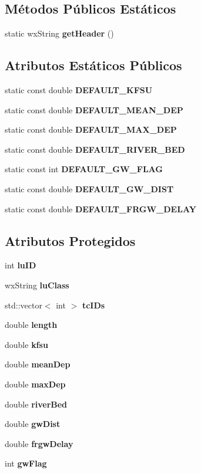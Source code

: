 \subsection*{Métodos Públicos Estáticos}
\begin{DoxyCompactItemize}
\item 
static wx\+String {\bf get\+Header} ()
\end{DoxyCompactItemize}
\subsection*{Atributos Estáticos Públicos}
\begin{DoxyCompactItemize}
\item 
static const double {\bf D\+E\+F\+A\+U\+L\+T\+\_\+\+K\+F\+SU}
\item 
static const double {\bf D\+E\+F\+A\+U\+L\+T\+\_\+\+M\+E\+A\+N\+\_\+\+D\+EP}
\item 
static const double {\bf D\+E\+F\+A\+U\+L\+T\+\_\+\+M\+A\+X\+\_\+\+D\+EP}
\item 
static const double {\bf D\+E\+F\+A\+U\+L\+T\+\_\+\+R\+I\+V\+E\+R\+\_\+\+B\+ED}
\item 
static const int {\bf D\+E\+F\+A\+U\+L\+T\+\_\+\+G\+W\+\_\+\+F\+L\+AG}
\item 
static const double {\bf D\+E\+F\+A\+U\+L\+T\+\_\+\+G\+W\+\_\+\+D\+I\+ST}
\item 
static const double {\bf D\+E\+F\+A\+U\+L\+T\+\_\+\+F\+R\+G\+W\+\_\+\+D\+E\+L\+AY}
\end{DoxyCompactItemize}
\subsection*{Atributos Protegidos}
\begin{DoxyCompactItemize}
\item 
int {\bf lu\+ID}
\item 
wx\+String {\bf lu\+Class}
\item 
std\+::vector$<$ int $>$ {\bf tc\+I\+Ds}
\item 
double {\bf length}
\item 
double {\bf kfsu}
\item 
double {\bf mean\+Dep}
\item 
double {\bf max\+Dep}
\item 
double {\bf river\+Bed}
\item 
double {\bf gw\+Dist}
\item 
double {\bf frgw\+Delay}
\item 
int {\bf gw\+Flag}
\end{DoxyCompactItemize}


